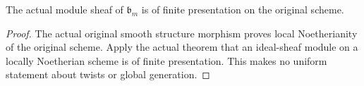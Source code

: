 \begin{theorem}\label{thm:sc0-original-global-asymptotic-finite-presentation}
\leanok
{}
The actual module sheaf of $\mathfrak b_m$ is of finite presentation
on the original scheme.
\end{theorem}
\begin{proof}
The actual original smooth structure morphism proves local
Noetherianity of the original scheme. Apply the actual theorem
that an ideal-sheaf module on a locally Noetherian scheme is of
finite presentation. This makes no uniform statement about twists
or global generation.
\end{proof}
